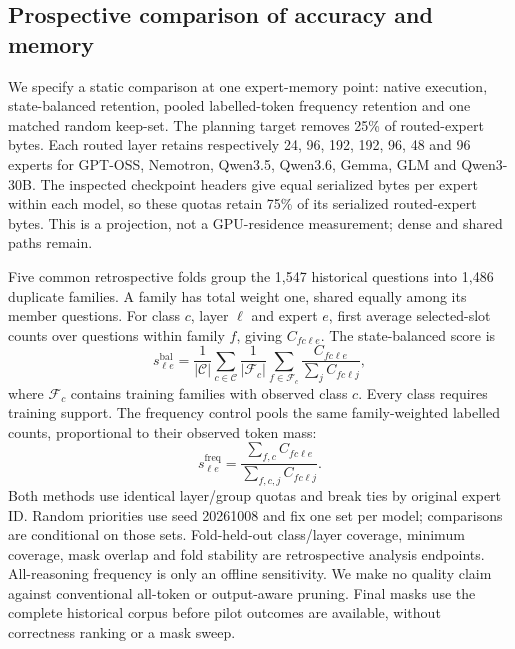 \subsection{Prospective comparison of accuracy and memory}
\label{sec:expert-memory-study}

We specify a static comparison at one expert-memory point: native execution,
state-balanced retention, pooled labelled-token frequency retention and one
matched random keep-set. The planning target removes 25\% of routed-expert
bytes. Each routed layer retains respectively 24, 96, 192, 192, 96, 48 and 96 experts
for GPT-OSS, Nemotron, Qwen3.5, Qwen3.6, Gemma, GLM and Qwen3-30B. The inspected
checkpoint headers give equal serialized bytes per expert within each model,
so these quotas retain 75\% of its serialized routed-expert bytes. This is a
projection, not a GPU-residence measurement; dense and shared paths remain.

Five common retrospective folds group the 1,547 historical questions into
1,486 duplicate families. A family has total weight one, shared equally among
its member questions. For class $c$, layer $\ell$ and expert $e$, first average
selected-slot counts over questions within family $f$, giving $C_{fc\ell e}$.
The state-balanced score is
\begin{equation}
 s^{\mathrm{bal}}_{\ell e}
 =\frac{1}{|\mathcal C|}\sum_{c\in\mathcal C}
   \frac{1}{|\mathcal F_c|}\sum_{f\in\mathcal F_c}
   \frac{C_{fc\ell e}}{\sum_j C_{fc\ell j}},
\end{equation}
where $\mathcal F_c$ contains training families with observed class $c$.
Every class requires training support. The frequency control pools the same
family-weighted labelled counts, proportional to their observed token mass:
\begin{equation}
 s^{\mathrm{freq}}_{\ell e}
 =\frac{\sum_{f,c}C_{fc\ell e}}{\sum_{f,c,j}C_{fc\ell j}}.
\end{equation}
Both methods use identical layer/group quotas and break ties by original
expert ID. Random priorities use seed 20261008 and fix one set per model;
comparisons are conditional on those sets. Fold-held-out class/layer coverage,
minimum coverage, mask overlap and fold stability are retrospective analysis
endpoints. All-reasoning frequency is only an offline sensitivity. We make no
quality claim against conventional all-token or output-aware pruning.
Final masks use the complete historical corpus before pilot outcomes are
available, without correctness ranking or a mask sweep.

